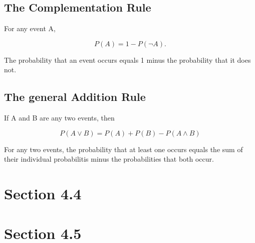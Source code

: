 \documentclass[12pt]{article}
\begin{document}
        \subsection*{The Complementation Rule}
            For any event A,
            \begin{center}
                \[
                    P(A) = 1 - P(\neg A).                
                \]
            \end{center}
            The probability that an event occurs equals 1 minus the probability that it does not.
        \subsection*{The general Addition Rule}
            If A and B are any two events, then
            \begin{center}
                \[
                    P(A \vee B) = P(A) + P(B) - P(A \wedge B) 
                \]
            \end{center}
            For any two events, the probability that at least one occurs equals the sum of their individual probabilitis minus the probabilities that both occur.
    \section*{Section 4.4}

    \section*{Section 4.5}
\end{document}
